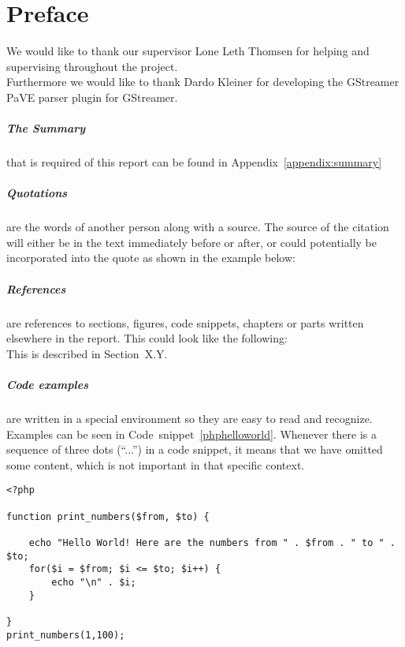 \chapter*{Preface}
\label{preface}
We would like to thank our supervisor Lone Leth Thomsen for helping and supervising throughout the project.\\
Furthermore we would like to thank Dardo Kleiner for developing the GStreamer PaVE parser plugin for GStreamer.

\paragraph{The Summary} that is required of this report can be found in Appendix~\ref{appendix:summary}

\paragraph{Quotations} are the words of another person along with a source.
The source of the citation will either be in the text immediately before or after, or could potentially be incorporated into the quote as shown in the example below: \\


\paragraph{References} are references to sections, figures, code snippets, chapters or parts written elsewhere in the report.
This could look like the following:\\

This is described in Section~X.Y.

\paragraph{Code examples} are written in a special environment so they are easy to read and recognize.
Examples can be seen in Code~snippet~\ref{phphelloworld}.
Whenever there is a sequence of three dots (``...'') in a code snippet, it means that we have omitted some content, which is not important in that specific context.

\begin{lstlisting}[style=sourceCode, caption={Code example of a hello world script written in PHP.}, label=phphelloworld]
<?php

function print_numbers($from, $to) {
    
    echo "Hello World! Here are the numbers from " . $from . " to " . $to;
    for($i = $from; $i <= $to; $i++) {
        echo "\n" . $i;
    }
    
}
print_numbers(1,100);

\end{lstlisting}